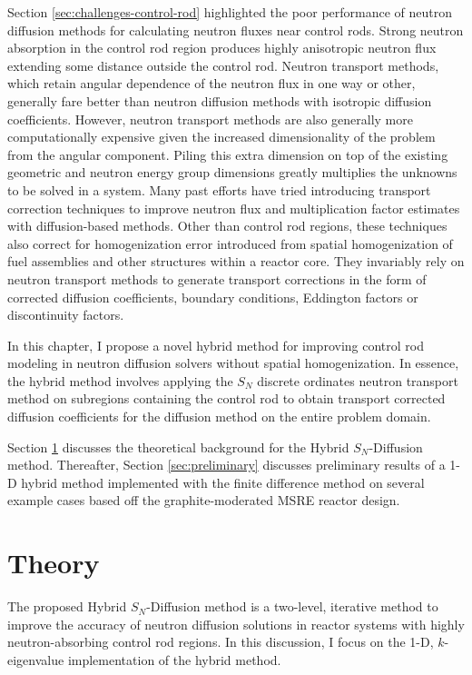 Section \ref{sec:challenges-control-rod} highlighted the poor performance of neutron diffusion
methods for calculating neutron fluxes near control rods. Strong neutron absorption in the control
rod region produces highly anisotropic neutron flux extending some distance outside the control
rod. Neutron transport methods, which retain angular dependence of the neutron flux in one way or
other, generally fare better than neutron diffusion methods with isotropic diffusion coefficients.
However, neutron transport methods are also generally more computationally expensive given the
increased dimensionality of the problem from the angular component. Piling this extra dimension on
top of the existing geometric and neutron energy group dimensions greatly multiplies the unknowns
to be solved in a system. Many past efforts have tried introducing transport correction techniques
to improve neutron flux and multiplication factor estimates with diffusion-based methods. Other
than control rod regions, these techniques also correct for homogenization error introduced from
spatial homogenization of fuel assemblies and other structures within a reactor core. They
invariably rely on neutron transport methods to generate transport corrections in the form of
corrected diffusion coefficients, boundary conditions, Eddington factors or discontinuity factors.

In this chapter, I propose a novel hybrid method for improving control rod modeling in neutron
diffusion solvers without spatial homogenization. In essence, the hybrid method involves applying
the $S_N$ discrete ordinates neutron transport method on subregions containing the control rod to
obtain transport corrected diffusion coefficients for the diffusion method on the entire problem
domain. 

Section \ref{sec:hybrid-theory} discusses the theoretical background for the Hybrid $S_N$-Diffusion
method. Thereafter, Section \ref{sec:preliminary} discusses preliminary results of a 1-D hybrid
method implemented with the finite difference method on several example cases based off the
graphite-moderated \gls{MSRE} reactor design.

\section{Theory} \label{sec:hybrid-theory}

The proposed Hybrid $S_N$-Diffusion method is a two-level, iterative method to improve the
accuracy of neutron diffusion solutions in reactor systems with highly neutron-absorbing control
rod regions. In this discussion, I focus on the 1-D, $k$-eigenvalue implementation of the
hybrid method.

